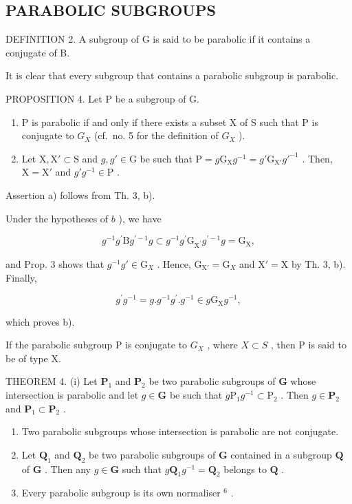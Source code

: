 \subsection{PARABOLIC SUBGROUPS}

DEFINITION 2. A subgroup of G is said to be parabolic if it contains a conjugate of B.

It is clear that every subgroup that contains a parabolic subgroup is parabolic.

PROPOSITION 4. Let P be a subgroup of G.

\begin{enumerate}
\def\labelenumi{\alph{enumi})}
\item
  P is parabolic if and only if there exists a subset X of S such that P is conjugate to \(G_{X}\) (cf.~no. 5 for the definition of \(G_{X}\) ).
\item
  Let \(\mathrm{X}, \mathrm{X}' \subset \mathrm{S}\) and \(g, g' \in \mathrm{G}\) be such that \(\mathrm{P} = g\mathrm{G}_{\mathrm{X}}g^{-1} = g'\mathrm{G}_{\mathrm{X}'}g'^{-1}\) . Then, \(\mathrm{X} = \mathrm{X}'\) and \(g'g^{-1} \in \mathrm{P}\) .
\end{enumerate}

Assertion a) follows from Th. 3, b).

Under the hypotheses of \(b\) ), we have

\[
g ^ {- 1} g ^ {\prime} \mathrm{B} g ^ {\prime - 1} g \subset g ^ {- 1} g ^ {\prime} \mathrm{G} _ {\mathrm{X} ^ {\prime}} g ^ {\prime - 1} g = \mathrm{G} _ {\mathrm{X}},
\]

and Prop. 3 shows that \(g^{-1}g' \in \mathrm{G}_X\) . Hence, \(\mathrm{G}_{\mathrm{X}'} = \mathrm{G}_X\) and \(\mathrm{X}' = \mathrm{X}\) by Th. 3, b). Finally,

\[
g ^ {\prime} g ^ {- 1} = g. g ^ {- 1} g ^ {\prime}. g ^ {- 1} \in g \mathrm{G} _ {\mathrm{X}} g ^ {- 1},
\]

which proves b).

If the parabolic subgroup P is conjugate to \(G_{X}\) , where \(X \subset S\) , then P is said to be of type X.

THEOREM 4. (i) Let \(\mathbf{P}_1\) and \(\mathbf{P}_2\) be two parabolic subgroups of \(\mathbf{G}\) whose intersection is parabolic and let \(g \in \mathbf{G}\) be such that \(g\mathrm{P}_1g^{-1} \subset \mathrm{P}_2\) . Then \(g \in \mathbf{P}_2\) and \(\mathbf{P}_1 \subset \mathbf{P}_2\) .

\begin{enumerate}
\def\labelenumi{(\roman{enumi})}
\setcounter{enumi}{1}
\item
  Two parabolic subgroups whose intersection is parabolic are not conjugate.
\item
  Let \(\mathbf{Q}_1\) and \(\mathbf{Q}_2\) be two parabolic subgroups of \(\mathbf{G}\) contained in a subgroup \(\mathbf{Q}\) of \(\mathbf{G}\) . Then any \(g \in \mathbf{G}\) such that \(g\mathbf{Q}_1g^{-1} = \mathbf{Q}_2\) belongs to \(\mathbf{Q}\) .
\item
  Every parabolic subgroup is its own normaliser \(^{6}\) .
\end{enumerate}

